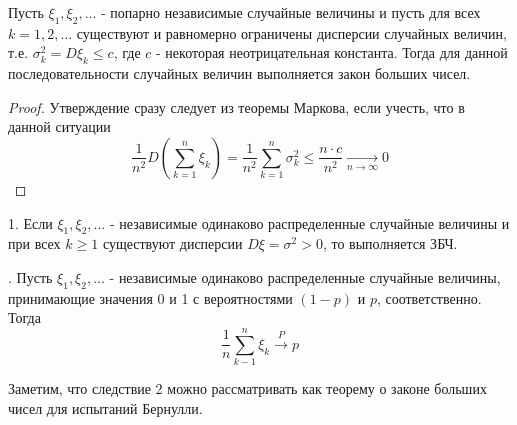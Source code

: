 \begin{theorem}
	Пусть $\xi_1, \xi_2, \dots$ - попарно независимые случайные величины и пусть для всех $k = 1, 2, \dots$ существуют и равномерно ограничены дисперсии случайных величин, т.е. $\sigma_k^2 = D\xi_k \le c$, где $c$ - некоторая неотрицательная константа. Тогда для данной последовательности случайных величин выполняется закон больших чисел.
	\begin{proof}
		Утверждение сразу следует из теоремы Маркова, если учесть, что в данной ситуации
		\[ \frac{1}{n^2} D \left( \sum_{k=1}^{n} \xi_k \right) = \frac{1}{n^2} \sum_{k=1}^{n} \sigma_k^2 \le \frac{n \cdot c}{n^2} \underset{n \to \infty}{\to} 0 \]
	\end{proof}
\end{theorem}

\begin{corollary}
	
	1. Если $\xi_1, \xi_2, \dots$ - независимые одинаково распределенные случайные величины и при всех $k \ge 1$ существуют дисперсии $D\xi = \sigma^2 > 0$, то выполняется ЗБЧ.
	
	. Пусть $\xi_1, \xi_2, \dots$ - независимые одинаково распределенные случайные величины, принимающие значения 0 и 1 с вероятностями $(1-p)$ и $p$, соответственно. Тогда
	\[ \frac{1}{n} \sum_{k-1}^{n} \xi_k \overset{P}{\to} p \]
	
	Заметим, что следствие 2 можно рассматривать как теорему о законе больших чисел для испытаний Бернулли.
\end{corollary}

